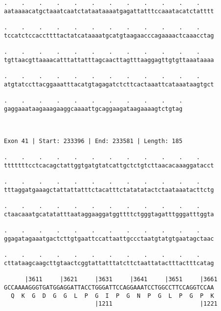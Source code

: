 \documentclass{article}
\begin{document}
\begin{Verbatim}
.    .    .    .    .    .    .    .    .    .    .    .    
aataaaacatgctaaatcaatctataataaaatgagattatttccaaatacatctatttt
                                                            
.    .    .    .    .    .    .    .    .    .    .    .    
tccatctccaccttttactatcataaaatgcatgtaagaacccagaaaactcaaacctag
                                                            
.    .    .    .    .    .    .    .    .    .    .    .    
tgttaacgttaaaacatttattatttagcaacttagtttaaggagttgtgttaaataaaa
                                                            
.    .    .    .    .    .    .    .    .    .    .    .    
atgtatccttacggaaatttacatgtagagatctcttcactaaattcataaataagtgct
                                                            
.    .    .    .    .    .    .    .    .    .    .
gaggaaataagaaagaaggcaaaattgcaggaagataagaaaagtctgtag
                                                   
                                                   
 
Exon 41 | Start: 233396 | End: 233581 | Length: 185
 
.    .    .    .    .    .    .    .    .    .    .    .    
tttttttcctcacagctattggtgatgtatcattgctctgtcttaacacaaaggatacct
                                                            
.    .    .    .    .    .    .    .    .    .    .    .    
tttaggatgaaagctattattatttctacatttctatatatactctaataaatacttctg
                                                            
.    .    .    .    .    .    .    .    .    .    .    .    
ctaacaaatgcatatatttaataggaaggatggttttctgggtagatttgggatttggta
                                                            
.    .    .    .    .    .    .    .    .    .    .    .    
ggagatagaaatgactcttgtgaattccattaattgccctaatgtatgtgaatagctaac
                                                            
.    .    .    .    .    .    .    .    .    .    .    .    
cttataagcaagcttgtaactcggtattatttatcttctaattatactttactttcatag
                                                            
      |3611     |3621     |3631     |3641     |3651     |3661
GCCAAAAGGGTGATGGAGGATTACCTGGGATTCCAGGAAATCCTGGCCTTCCAGGTCCAA
  Q  K  G  D  G  G  L  P  G  I  P  G  N  P  G  L  P  G  P  K
                          |1211                         |1221
  

\end{Verbatim}
\end{document}
